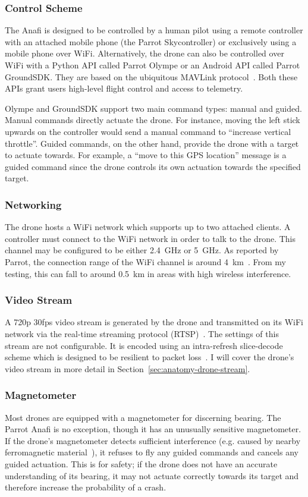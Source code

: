 \subsubsection{Control Scheme}
The Anafi is designed to be controlled by a human pilot using a remote controller with an attached mobile phone (the Parrot Skycontroller) or exclusively using a mobile phone over WiFi. Alternatively, the drone can also be controlled over WiFi with a Python API called Parrot Olympe or an Android API called Parrot GroundSDK. They are based on the ubiquitous MAVLink protocol~\cite{MAVLink}. Both these APIs grant users high-level flight control and access to telemetry.

Olympe and GroundSDK support two main command types: manual and guided. Manual commands directly actuate the drone. For instance, moving the left stick upwards on the controller would send a manual command to ``increase vertical throttle''. Guided commands, on the other hand, provide the drone with a target to actuate towards. For example, a ``move to this GPS location'' message is a guided command since the drone controls its own actuation towards the specified target.

\subsubsection{Networking}
The drone hosts a WiFi network which supports up to two attached clients. A controller must connect to the WiFi network in order to talk to the drone. This channel may be configured to be either 2.4~GHz or 5~GHz. As reported by Parrot, the connection range of the WiFi channel is around 4~km~\cite{ParrotAnafi}. From my testing, this can fall to around 0.5~km in areas with high wireless interference.

\subsubsection{Video Stream}
A 720p 30fps video stream is generated by the drone and transmitted on its WiFi network via the real-time streaming protocol (RTSP)~\cite{RTSP}. The settings of this stream are not configurable. It is encoded using an intra-refresh slice-decode scheme which is designed to be resilient to packet loss~\cite{Cloudinary}. I will cover the drone's video stream in more detail in Section~\ref{sec:anatomy-drone-stream}.

\subsubsection{Magnetometer}
Most drones are equipped with a magnetometer for discerning bearing. The Parrot Anafi is no exception, though it has an unusually sensitive magnetometer. If the drone's magnetometer detects sufficient interference (e.g. caused by nearby ferromagnetic material~\cite{Ardupilot}), it refuses to fly any guided commands and cancels any guided actuation. This is for safety; if the drone does not have an accurate understanding of its bearing, it may not actuate correctly towards its target and therefore increase the probability of a crash.

